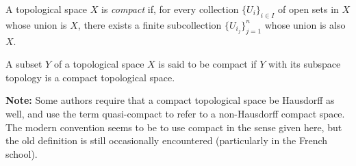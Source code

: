\documentclass[12pt]{article}
\begin{document}
A topological space $X$ is {\em compact} if, for every collection $\{U_i\}_{i \in I}$ of open sets in $X$ whose union is $X$, there exists a finite subcollection $\{U_{i_j}\}_{j=1}^n$ whose union is also $X$.

A subset $Y$ of a topological space $X$ is said to be compact if $Y$ with its subspace topology is a compact topological space.

\textbf{Note:} Some authors require that a compact topological space be Hausdorff as well, and use the term quasi-compact to refer to a non-Hausdorff compact space. The modern convention seems to be to use compact in the sense given here, but the old definition is still occasionally encountered (particularly in the French school).
\end{document}
